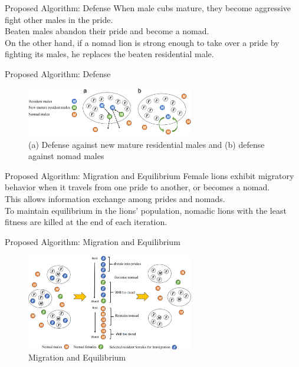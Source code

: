 \documentclass[xcolor=table]{beamer}
\begin{document}
\begin{frame}{Proposed Algorithm: Defense}
When male cubs mature, they become aggressive fight other males in the pride.\\Beaten males abandon their pride and become a nomad.\\On the other hand, if a nomad lion is strong enough to take over a pride by fighting its males, he replaces the beaten residential male. 
\end{frame}

\begin{frame}{Proposed Algorithm: Defense}
  \begin{figure}[h]
  \begin{center}
  \includegraphics[width=0.65\textwidth]{img/defense/defense}
  \caption{(a) Defense against new mature residential males and (b) defense against nomad males}
  \end{center}
  \end{figure}
\end{frame}

\begin{frame}{Proposed Algorithm: Migration and Equilibrium}
Female lions exhibit migratory behavior when it travels from one pride to another, or becomes a nomad. \\ This allows information exchange among prides and nomads.\\ To maintain equilibrium in the lions' population, nomadic lions with the least fitness are killed at the end of each iteration.
\end{frame}

\begin{frame}{Proposed Algorithm: Migration and Equilibrium}
  \begin{figure}[h]
  \begin{center}
  \includegraphics[width=0.65\textwidth]{img/equilibrium/equilibrium}
  \caption{Migration and Equilibrium}
  \end{center}
  \end{figure}
\end{frame}
\end{document}

